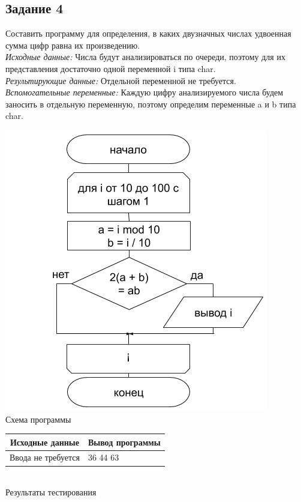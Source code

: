 \documentclass[a4paper,14pt]{extarticle}
\begin{document}
\subsection{Задание 4}
Составить программу для определения, в каких двузначных числах удвоенная сумма цифр равна их произведению.\\
\textit{Исходные данные:} Числа будут анализироваться по очереди, поэтому для их представления достаточно одной переменной i типа char.\\
\textit{Результирующие данные:} Отдельной переменной не требуется.\\
\textit{Вспомогательные переменные:}  Каждую цифру анализируемого числа будем заносить в отдельную переменную, поэтому определим переменные a и b типа char.
\begin{center}
\includegraphics[scale=0.6]{lab2-4.png}\\
Схема программы
\end{center}

\begin{center}
\begin{tabular}{|p{7cm}|p{7cm}|}
\hline
\multicolumn{1}{|c|}{Исходные данные}& \multicolumn{1}{|c|}{Вывод программы}\\
\hline
Ввода не требуется & 36 44 63\\
\hline
\end{tabular}\\
\vspace{0.3cm}
Результаты тестирования
\end{center}
\end{document}
